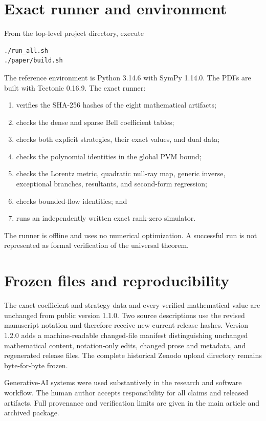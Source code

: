 \documentclass[10pt]{article}
\begin{document}
\section{Exact runner and environment}

From the top-level project directory, execute
\begin{verbatim}
./run_all.sh
./paper/build.sh
\end{verbatim}
The reference environment is Python 3.14.6 with SymPy 1.14.0. The PDFs are
built with Tectonic 0.16.9. The exact runner:
\begin{enumerate}[leftmargin=*]
\item verifies the SHA-256 hashes of the eight mathematical artifacts;
\item checks the dense and sparse Bell coefficient tables;
\item checks both explicit strategies, their exact values, and dual data;
\item checks the polynomial identities in the global PVM bound;
\item checks the Lorentz metric, quadratic null-ray map, generic inverse,
exceptional branches, resultants, and second-form regression;
\item checks bounded-flow identities; and
\item runs an independently written exact rank-zero simulator.
\end{enumerate}

The runner is offline and uses no numerical optimization. A successful run is
not represented as formal verification of the universal theorem.

\section{Frozen files and reproducibility}

The exact coefficient and strategy data and every verified mathematical value
are unchanged from public version 1.1.0. Two source descriptions use the
revised manuscript notation and therefore receive new current-release hashes.
Version 1.2.0 adds a machine-readable changed-file manifest distinguishing
unchanged mathematical content, notation-only edits, changed prose and
metadata, and regenerated release files. The complete historical Zenodo upload
directory remains byte-for-byte frozen.

Generative-AI systems were used substantively in the research and software
workflow. The human author accepts responsibility for all claims and released
artifacts. Full provenance and verification limits are given in the main
article and archived package.
\end{document}
